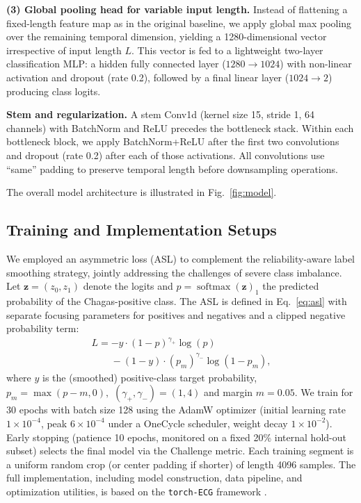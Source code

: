 \documentclass[twocolumn]{cinc}
\begin{document}
\textbf{(3) Global pooling head for variable input length.} Instead of flattening a fixed-length feature map as in the original baseline, we apply global max pooling over the remaining temporal dimension, yielding a 1280-dimensional vector irrespective of input length $L$. This vector is fed to a lightweight two-layer classification MLP: a hidden fully connected layer ($1280 \to 1024$) with non-linear activation and dropout (rate 0.2), followed by a final linear layer ($1024 \to 2$) producing class logits.

\textbf{Stem and regularization.} A stem Conv1d (kernel size 15, stride 1, 64 channels) with BatchNorm and ReLU precedes the bottleneck stack. Within each bottleneck block, we apply BatchNorm+ReLU after the first two convolutions and dropout (rate 0.2) after each of those activations. All convolutions use “same” padding to preserve temporal length before downsampling operations.

The overall model architecture is illustrated in Fig.~\ref{fig:model}.


\subsection{Training and Implementation Setups}
\label{subsec:train}


We employed an asymmetric loss (ASL) \cite{ridnik2021asymmetric_loss} to complement the reliability-aware label smoothing strategy, jointly addressing the challenges of severe class imbalance. Let ${\mathbf{z}} = (z_0, z_1)$ denote the logits and $p=\operatorname{softmax}({\mathbf{z}})_1$ the predicted probability of the Chagas-positive class. The ASL is defined in Eq.~\ref{eq:asl} with separate focusing parameters for positives and negatives and a clipped negative probability term:
\begin{equation}
\label{eq:asl}
\begin{multlined}
L = -y \cdot (1-p)^{\gamma_{+}} \log(p) \\
\phantom{L = } - (1-y) \cdot (p_m)^{\gamma_{-}} \log(1-p_m),
\end{multlined}
\end{equation}
where $y$ is the (smoothed) positive-class target probability, $p_m = \max(p - m, 0),$ $(\gamma_{+},\gamma_{-})=(1,4)$ and margin $m=0.05$. We train for 30 epochs with batch size 128 using the AdamW optimizer (initial learning rate $1\times10^{-4}$, peak $6\times10^{-4}$ under a OneCycle scheduler, weight decay $1\times10^{-2}$). Early stopping (patience 10 epochs, monitored on a fixed 20\% internal hold-out subset) selects the final model via the Challenge metric. Each training segment is a uniform random crop (or center padding if shorter) of length 4096 samples. The full implementation, including model construction, data pipeline, and optimization utilities, is based on the \texttt{torch-ECG} framework \cite{torch_ecg_paper}.
\end{document}
